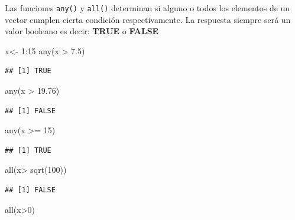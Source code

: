 \documentclass[
]{book}
\newenvironment{Shaded}{\begin{snugshade}}{\end{snugshade}}
\newcommand{\DecValTok}[1]{\textcolor[rgb]{0.00,0.00,0.81}{#1}}
\newcommand{\FloatTok}[1]{\textcolor[rgb]{0.00,0.00,0.81}{#1}}
\newcommand{\FunctionTok}[1]{\textcolor[rgb]{0.00,0.00,0.00}{#1}}
\newcommand{\NormalTok}[1]{#1}
\newcommand{\OtherTok}[1]{\textcolor[rgb]{0.56,0.35,0.01}{#1}}
\newcommand{\SpecialCharTok}[1]{\textcolor[rgb]{0.00,0.00,0.00}{#1}}
\begin{document}
Las funciones \texttt{any()} y \texttt{all()} determinan si alguno o todos los elementos de un vector cumplen cierta condición respectivamente. La respuesta siempre será un valor booleano es decir: \textbf{TRUE} o \textbf{FALSE}

\begin{Shaded}
\begin{Highlighting}[]
\NormalTok{x}\OtherTok{\textless{}{-}} \DecValTok{1}\SpecialCharTok{:}\DecValTok{15}
\FunctionTok{any}\NormalTok{(x }\SpecialCharTok{\textgreater{}} \FloatTok{7.5}\NormalTok{)}
\end{Highlighting}
\end{Shaded}

\begin{verbatim}
## [1] TRUE
\end{verbatim}

\begin{Shaded}
\begin{Highlighting}[]
\FunctionTok{any}\NormalTok{(x }\SpecialCharTok{\textgreater{}} \FloatTok{19.76}\NormalTok{)}
\end{Highlighting}
\end{Shaded}

\begin{verbatim}
## [1] FALSE
\end{verbatim}

\begin{Shaded}
\begin{Highlighting}[]
\FunctionTok{any}\NormalTok{(x }\SpecialCharTok{\textgreater{}=} \DecValTok{15}\NormalTok{)}
\end{Highlighting}
\end{Shaded}

\begin{verbatim}
## [1] TRUE
\end{verbatim}

\begin{Shaded}
\begin{Highlighting}[]
\FunctionTok{all}\NormalTok{(x}\SpecialCharTok{\textgreater{}} \FunctionTok{sqrt}\NormalTok{(}\DecValTok{100}\NormalTok{))}
\end{Highlighting}
\end{Shaded}

\begin{verbatim}
## [1] FALSE
\end{verbatim}

\begin{Shaded}
\begin{Highlighting}[]
\FunctionTok{all}\NormalTok{(x}\SpecialCharTok{\textgreater{}}\DecValTok{0}\NormalTok{)}
\end{Highlighting}
\end{Shaded}
\end{document}
